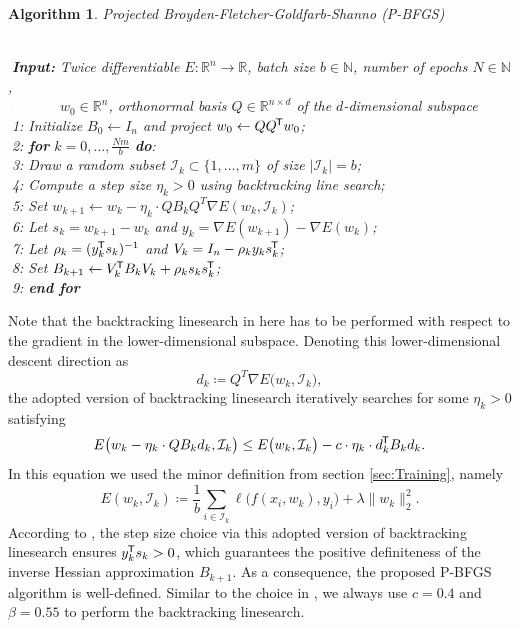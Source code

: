 \documentclass[11pt, a4paper]{article}
\newtheorem{algorithm}[theorem]{Algorithm}
\newcommand{\N}{\mathbb{N}}
\newcommand{\R}{\mathbb{R}}
\newcommand{\I}{\mathcal{I}}
\newcommand*{\tr}{^{\mkern-1.5mu\mathsf{T}}}
\begin{document}
\begin{algorithm}
\caption{Projected Broyden-Fletcher-Goldfarb-Shanno (P-BFGS) \textcolor{white}{$\Big |$}} \ \\
\textcolor{white}{$\Big |$}\textbf{Input:} Twice differentiable $E: \R^n \to \R$, batch size $b \in \N$, number of epochs $N \in \N$, \\
\textcolor{white}{$\Big |$\textbf{Input:}} $w_0 \in \R^n$, orthonormal basis $Q \in \R^{n \times d}$ of the $d$-dimensional subspace \\
\textcolor{white}{$\Big |$}1: Initialize $B_0 \leftarrow I_n$ and project $w_0 \leftarrow QQ\tr w_0$; \\
\textcolor{white}{$\Big |$}2: \textbf{for} $k=0, \dots, \frac{Nm}{b}$ \textbf{do}: \\
\textcolor{white}{$\Big |$}3: \quad Draw a random subset $\I_k \subset \{1, \dots, m \}$ of size $| \I_k | = b$; \\
\textcolor{white}{$\Big |$}4: \quad Compute a step size $\eta_k > 0$ using backtracking line search; \\
\textcolor{white}{$\Big |$}5: \quad Set $w_{k+1} \leftarrow w_k - \eta_k \cdot Q B_k Q^T \nabla E(w_k,\I_k)$; \\
\textcolor{white}{$\Big |$}6: \quad Let $s_k = w_{k+1} - w_{k}$ and $y_k = \nabla E(w_{k+1}) - \nabla E(w_{k})$; \\
\textcolor{white}{$\Big |$}7: \quad Let $\rho_k = (y_k\tr s_k)^{-1}$ and $V_k = I_n - \rho_k y_k s_k\tr $; \\
\textcolor{white}{$\Big |$}8: \quad Set $B_{k+1} \leftarrow V_k\tr B_{k}V_k + \rho_k s_k s_k\tr $; \\
\textcolor{white}{$\Big |$}9: \textbf{end for}
\end{algorithm}

Note that the backtracking linesearch in here has to be performed with respect to the gradient in the lower-dimensional subspace. Denoting this lower-dimensional descent direction as
\[ d_k \coloneq Q^T \nabla E \big (w_k,\I_k \big), \] 
the adopted version of backtracking linesearch iteratively searches for some $\eta_k > 0$ satisfying 
\[ E \big (w_k - \eta_k \cdot Q B_k d_k, \I_k \big) \leq E \big (w_k, \I_k \big ) - c \cdot \eta_k \cdot d_k \tr B_k d_k. \]
In this equation we used the minor definition from section \ref{sec:Training}, namely 
\[ E(w_k,\I_k) \coloneq \frac{1}{b} \sum_{i \in \I_k}^{}  \ell \big ( f(x_i,w_k),y_i \big) + \lambda \big \| w_k \big \|_2^2. \]
According to \cite{Paper}, the step size choice via this adopted version of backtracking linesearch ensures $y_k \tr s_k > 0$, which guarantees the positive definiteness of the inverse Hessian approximation $B_{k+1}$. As a consequence, the proposed P-BFGS algorithm is well-defined. Similar to the choice in \cite{Paper}, we always use $c = 0.4$ and $\beta = 0.55$ to perform the backtracking linesearch.
\end{document}

